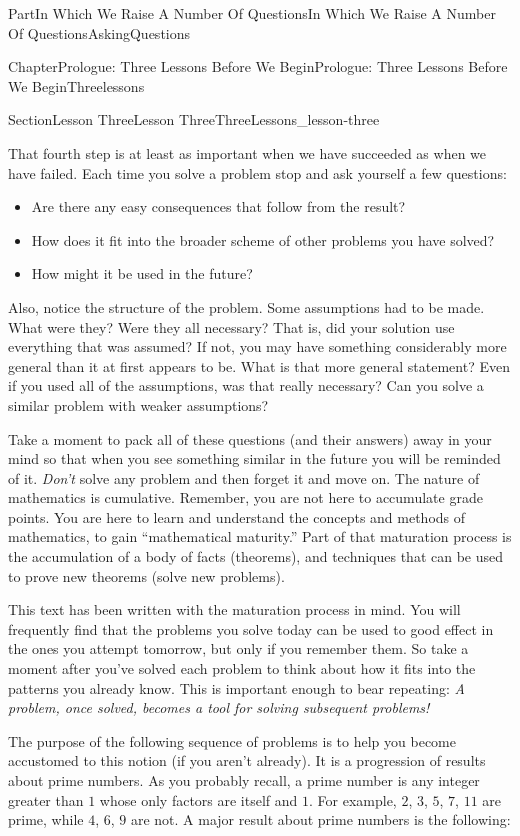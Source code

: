 \documentclass[oneside,10pt,]{book}
\numberwithin{equation}{part}
\begin{document}
\begin{partptx}{Part}{In Which We Raise A Number Of Questions}{}{In Which We Raise A Number Of Questions}{}{}{AskingQuestions}
\begin{chapterptx}{Chapter}{Prologue: Three Lessons Before We Begin}{}{Prologue: Three Lessons Before We Begin}{}{}{Threelessons}
\begin{sectionptx}{Section}{Lesson Three}{}{Lesson Three}{}{}{ThreeLessons_lesson-three}
\par
That fourth step is at least as important when we have succeeded as when we have failed.  Each time you solve a problem stop and ask yourself a few questions:%
\begin{itemize}[label=\textbullet]
\item{}Are there any easy consequences that follow from the result?%
\item{}How does it fit into the broader scheme of other problems you have solved?%
\item{}How might it be used in the future?%
\end{itemize}
%
\par
Also, notice the structure of the problem.  Some assumptions had to be made.  What were they?  Were they all necessary?  That is, did your solution use everything that was assumed?  If not, you may have something considerably more general than it at first appears to be.  What is that more general statement?  Even if you used all of the assumptions, was that really necessary?  Can you solve a similar problem with weaker assumptions?%
\par
Take a moment to pack all of these questions (and their answers) away in your mind so that when you see something similar in the future you will be reminded of it.  \emph{Don't} solve any problem and then forget it and move on.  The nature of mathematics is cumulative.  Remember, you are not here to accumulate grade points.  You are here to learn and understand the concepts and methods of mathematics, to gain ``mathematical maturity.'' Part of that maturation process is the accumulation of a body of facts (theorems), and techniques that can be used to prove new theorems (solve new problems).%
\par
This text has been written with the maturation process in mind. You will frequently find that the problems you solve today can be used to good effect in the ones you attempt tomorrow, but only if you remember them.  So take a moment after you've solved each problem to think about how it fits into the patterns you already know.  This is important enough to bear repeating: \emph{A problem, once solved, becomes a tool for solving subsequent problems!}%
\par
The purpose of the following sequence of problems is to help you become accustomed to this notion (if you aren't already).  It is a progression of results about prime numbers.  As you probably recall, a prime number is any integer greater than \(1\) whose only factors are itself and \(1\).  For example, \(2\), \(3\), \(5\), \(7\), \(11\) are prime, while \(4\), \(6\), \(9\) are not.  A major result about prime numbers is the following:%

\end{sectionptx}
\end{chapterptx}
\end{partptx}
\end{document}
